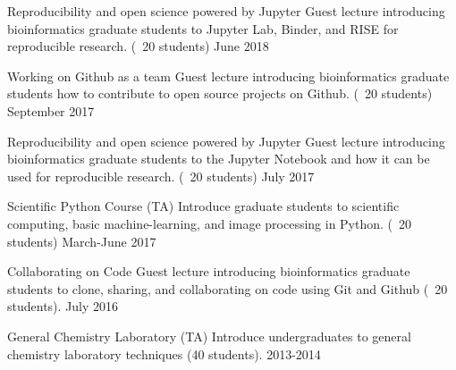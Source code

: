 
\begin{cvteaching}


  \cvteach
    {Reproducibility and open science powered by Jupyter}
    {Guest lecture introducing bioinformatics graduate students to Jupyter Lab, Binder, and RISE for reproducible research. (~20 students)}
    {June 2018}

  \cvteach
    {Working on Github as a team}
    {Guest lecture introducing bioinformatics graduate students how to contribute to open source projects on Github. (~20 students)}
    {September 2017}

  \cvteach
    {Reproducibility and open science powered by Jupyter}
    {Guest lecture introducing bioinformatics graduate students to the Jupyter Notebook and how it can be used for reproducible research. (~20 students)}
    {July 2017}

  \cvteach
    {Scientific Python Course (TA)}
    {Introduce graduate students to scientific computing, basic machine-learning, and image processing in Python. (~20 students)}
    {March-June 2017}

  \cvteach
    {Collaborating on Code}
    {Guest lecture introducing bioinformatics graduate students to clone, sharing, and collaborating on code using Git and Github (~20 students).}
    {July 2016}

  \cvteach
    {General Chemistry Laboratory (TA)}
    {Introduce undergraduates to general chemistry laboratory techniques (40 students).}
    {2013-2014}

\end{cvteaching}
